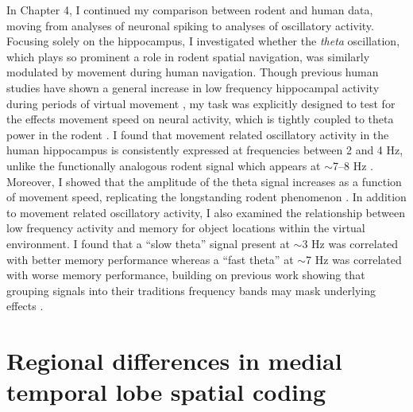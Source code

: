 In Chapter 4, I continued my comparison between rodent and human data, moving from analyses of neuronal spiking to analyses of oscillatory activity. Focusing solely on the hippocampus, I investigated whether the \textit{theta} oscillation, which plays so prominent a role in rodent spatial navigation, was similarly modulated by movement during human navigation. Though previous human studies have shown a general increase in low frequency hippocampal activity during periods of virtual movement \citep{CaplEtal03,EkstEtal05,JacoEtal10c}, my task was explicitly designed to test for the effects movement speed on neural activity, which is tightly coupled to theta power in the rodent \citep{Vand69}. I found that movement related oscillatory activity in the human hippocampus is consistently expressed at frequencies between 2 and 4 Hz, unlike the functionally analogous rodent signal which appears at $\sim$7--8 Hz \citep{Buzs02}. Moreover, I showed that the amplitude of the theta signal increases as a function of movement speed, replicating the longstanding rodent phenomenon \citep{McFaEtal75}. In addition to movement related oscillatory activity, I also examined the relationship between low frequency activity and memory for object locations within the virtual environment. I found that a ``slow theta'' signal present at $\sim$3 Hz was correlated with better memory performance whereas a ``fast theta'' at $\sim$7 Hz was correlated with worse memory performance, building on previous work showing that grouping signals into their traditions frequency bands may mask underlying effects \citep{LegaEtal12}.



\section{Regional differences in medial temporal lobe spatial coding}

